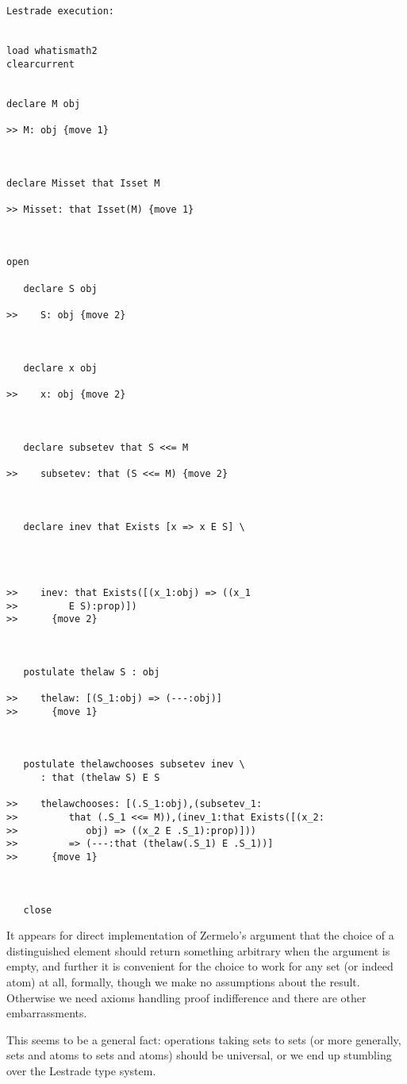 \documentclass[12pt]{article}
\begin{document}
\begin{verbatim}Lestrade execution:


load whatismath2
clearcurrent


declare M obj

>> M: obj {move 1}



declare Misset that Isset M

>> Misset: that Isset(M) {move 1}



open

   declare S obj

>>    S: obj {move 2}



   declare x obj

>>    x: obj {move 2}



   declare subsetev that S <<= M

>>    subsetev: that (S <<= M) {move 2}



   declare inev that Exists [x => x E S] \
      



>>    inev: that Exists([(x_1:obj) => ((x_1
>>         E S):prop)])
>>      {move 2}



   postulate thelaw S : obj

>>    thelaw: [(S_1:obj) => (---:obj)]
>>      {move 1}



   postulate thelawchooses subsetev inev \
      : that (thelaw S) E S

>>    thelawchooses: [(.S_1:obj),(subsetev_1:
>>         that (.S_1 <<= M)),(inev_1:that Exists([(x_2:
>>            obj) => ((x_2 E .S_1):prop)]))
>>         => (---:that (thelaw(.S_1) E .S_1))]
>>      {move 1}



   close
\end{verbatim}

It appears for direct implementation of Zermelo's argument that the choice of a distinguished element should return something arbitrary when the argument is empty,
and further it is convenient for the choice to work for any set (or indeed atom) at all, formally, though we make no assumptions about the result.  Otherwise we need
axioms handling proof indifference and there are other embarrassments.

This seems to be a general fact:  operations taking sets to sets (or more generally, sets and atoms to sets and atoms) should be universal, or we end up stumbling over the Lestrade type system.
\end{document}

